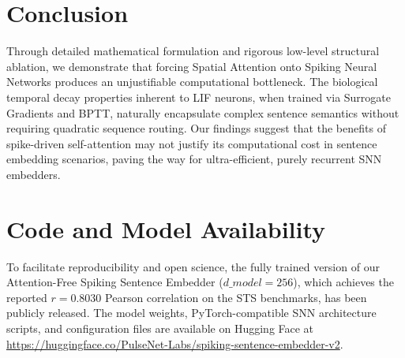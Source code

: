 \documentclass{article} %
\begin{document}
\section{Conclusion}
Through detailed mathematical formulation and rigorous low-level structural ablation, we demonstrate that forcing Spatial Attention onto Spiking Neural Networks produces an unjustifiable computational bottleneck. The biological temporal decay properties inherent to LIF neurons, when trained via Surrogate Gradients and BPTT, naturally encapsulate complex sentence semantics without requiring quadratic sequence routing. Our findings suggest that the benefits of spike-driven self-attention may not justify its computational cost in sentence embedding scenarios, paving the way for ultra-efficient, purely recurrent SNN embedders.


\section{Code and Model Availability}
To facilitate reproducibility and open science, the fully trained version of our Attention-Free Spiking Sentence Embedder ($d\_model = 256$), which achieves the reported $r = 0.8030$ Pearson correlation on the STS benchmarks, has been publicly released. The model weights, PyTorch-compatible SNN architecture scripts, and configuration files are available on Hugging Face at \url{https://huggingface.co/PulseNet-Labs/spiking-sentence-embedder-v2}.



\end{document}
